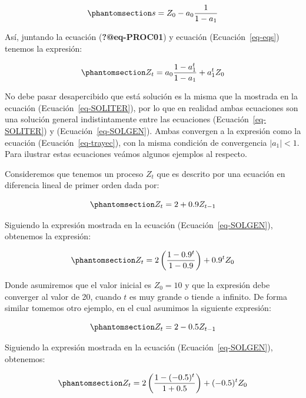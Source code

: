 \documentclass[
  a4paper,
]{article}
\begin{document}
\begin{equation}\phantomsection\label{eq-eqs}{
    s = Z_0 - a_0 \frac{1}{1 - a_1}
}\end{equation}

Así, juntando la ecuación (\textbf{?@eq-PROC01}) y ecuación
(Ecuación~\ref{eq-eqs}) tenemos la expresión:

\begin{equation}\phantomsection\label{eq-SOLGEN}{
    Z_t = a_0 \frac{1 - a^t_1}{1 - a_1} + a^t_1 Z_0
}\end{equation}

No debe pasar desapercibido que está solución es la misma que la
mostrada en la ecuación (Ecuación~\ref{eq-SOLITER}), por lo que en
realidad ambas ecuaciones son una solución general indistintamente entre
las ecuaciones (Ecuación~\ref{eq-SOLITER}) y (Ecuación~\ref{eq-SOLGEN}).
Ambas convergen a la expresión como la ecuación
(Ecuación~\ref{eq-trayec}), con la misma condición de convergencia
\(|a_1| < 1\). Para ilustrar estas ecuaciones veámos algunos ejemplos al
respecto.

Consideremos que tenemos un proceso \(Z_t\) que es descrito por una
ecuación en diferencia lineal de primer orden dada por:

\begin{equation}\phantomsection\label{eq-ex1}{
    Z_t = 2 + 0.9 Z_{t-1}
}\end{equation}

Siguiendo la expresión mostrada en la ecuación
(Ecuación~\ref{eq-SOLGEN}), obtenemos la expresión:

\begin{equation}\phantomsection\label{eq-ex2}{
    Z_t = 2 \left( \frac{1 - 0.9^{t}}{1 - 0.9} \right) + 0.9^t Z_0
}\end{equation}

Donde asumiremos que el valor inicial es \(Z_0 = 10\) y que la expresión
debe converger al valor de 20, cuando \(t\) es muy grande o tiende a
infinito. De forma similar tomemos otro ejemplo, en el cual asumimos la
siguiente expresión:

\begin{equation}\phantomsection\label{eq-ex3}{
    Z_t = 2 - 0.5 Z_{t-1}
}\end{equation}

Siguiendo la expresión mostrada en la ecuación
(Ecuación~\ref{eq-SOLGEN}), obtenemos:

\begin{equation}\phantomsection\label{eq-ex4}{
    Z_t = 2 \left( \frac{1 - (-0.5)^{t}}{1 + 0.5} \right) + (-0.5)^t Z_0
}\end{equation}
\end{document}
